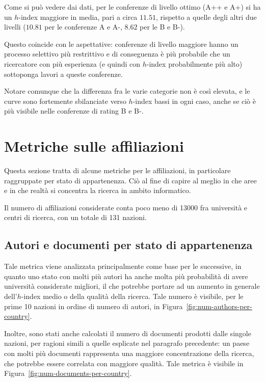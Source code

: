 Come si può vedere dai dati, per le conferenze di livello ottimo (A++ e A+)
si ha un $h$-index maggiore in media, pari a circa $11.51$, rispetto a quelle
degli altri due livelli ($10.81$ per le conferenze A e A-, $8.62$ per le B e
B-).

Questo coincide con le aspettative: conferenze di livello maggiore hanno
un processo selettivo più restrittivo e di conseguenza è più probabile
che un ricercatore con più esperienza (e quindi con $h$-index probabilmente
più alto) sottoponga lavori a queste conferenze.

Notare comunque che la differenza fra le varie categorie non è così elevata,
e le curve sono fortemente sbilanciate verso $h$-index bassi in ogni caso,
anche se ciò è più visibile nelle conferenze di rating B e B-.

\section{Metriche sulle affiliazioni}

Questa sezione tratta di alcune metriche per le affiliazioni, in particolare
raggruppate per stato di appartenenza. Ciò al fine di capire al meglio
in che aree e in che realtà si concentra la ricerca in ambito informatico.

Il numero di affiliazioni considerate conta poco meno di 13000 fra università
e centri di ricerca, con un totale di 131 nazioni.

\subsection{Autori e documenti per stato di appartenenza}
\label{ssec:authors-docs-per-country}

Tale metrica viene analizzata principalmente come base per le successive, in
quanto uno stato con molti più autori ha anche molta più probabilità di avere
università considerate migliori, il che potrebbe portare ad un aumento
in generale dell'$h$-index medio o della qualità della ricerca.
Tale numero è visibile, per le prime 10 nazioni in ordine di numero di autori,
in Figura~\ref{fig:num-authors-per-country}.

Inoltre, sono stati anche calcolati il numero di documenti prodotti dalle singole
nazioni, per ragioni simili a quelle esplicate nel paragrafo precedente: un
paese con molti più documenti rappresenta una maggiore concentrazione della
ricerca, che potrebbe essere correlata con maggiore qualità.
Tale metrica è visibile in Figura~\ref{fig:num-documents-per-country}.


